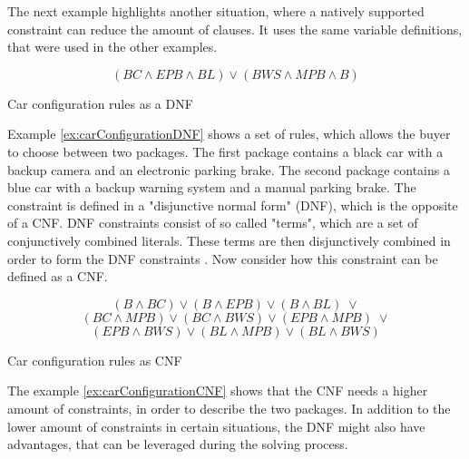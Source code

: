 The next example highlights another situation, where a natively supported constraint can reduce the amount of clauses. It uses the same variable definitions, that were used in the other examples.

\begin{example}
\begin{leftbar}
\begin{displaymath}
(BC \wedge EPB \wedge BL) \vee (BWS \wedge MPB \wedge B)
\end{displaymath}
\end{leftbar}
\caption{Car configuration rules as a DNF}
\label{ex:carConfigurationDNF}
\end{example}

Example \ref{ex:carConfigurationDNF} shows a set of rules, which allows the buyer to choose between two packages. The first package contains a black car with a backup camera and an electronic parking brake. The second package contains a blue car with a backup warning system and a manual parking brake. The constraint is defined in a "disjunctive normal form" (DNF), which is the opposite of a CNF. DNF constraints consist of so called "terms", which are a set of conjunctively combined literals. These terms are then disjunctively combined in order to form the DNF constraints \cite{biere2009handbook}. Now consider how this constraint can be defined as a CNF.

\begin{example}
\begin{leftbar}
\begin{displaymath}
(B \wedge BC) \vee (B \wedge EPB) \vee (B \wedge BL) \; \vee
\end{displaymath}
\begin{displaymath}
(BC \wedge MPB) \vee (BC \wedge BWS) \vee (EPB \wedge MPB) \; \vee
\end{displaymath}
\begin{displaymath}
(EPB \wedge BWS) \vee (BL \wedge MPB) \vee (BL \wedge BWS)
\end{displaymath}
\end{leftbar}
\caption{Car configuration rules as CNF}
\label{ex:carConfigurationCNF}
\end{example}

The example \ref{ex:carConfigurationCNF} shows that the CNF needs a higher amount of constraints, in order to describe the two packages. In addition to the lower amount of constraints in certain situations, the DNF might also have advantages, that can be leveraged during the solving process.

